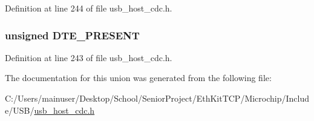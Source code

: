 Definition at line 244 of file usb\+\_\+host\+\_\+cdc.\+h.

\hypertarget{union___u_s_b___c_d_c___c_o_n_t_r_o_l___s_i_g_n_a_l___b_i_t_m_a_p_abd62ba5a2ebbfe1cf985381168371760}{}
\subsubsection[{D\+T\+E\+\_\+\+P\+R\+E\+S\+E\+N\+T}]{\setlength{\rightskip}{0pt plus 5cm}unsigned D\+T\+E\+\_\+\+P\+R\+E\+S\+E\+N\+T}\label{union___u_s_b___c_d_c___c_o_n_t_r_o_l___s_i_g_n_a_l___b_i_t_m_a_p_abd62ba5a2ebbfe1cf985381168371760}


Definition at line 243 of file usb\+\_\+host\+\_\+cdc.\+h.



The documentation for this union was generated from the following file\+:\begin{DoxyCompactItemize}
\item 
C\+:/\+Users/mainuser/\+Desktop/\+School/\+Senior\+Project/\+Eth\+Kit\+T\+C\+P/\+Microchip/\+Include/\+U\+S\+B/\hyperlink{usb__host__cdc_8h}{usb\+\_\+host\+\_\+cdc.\+h}\end{DoxyCompactItemize}
